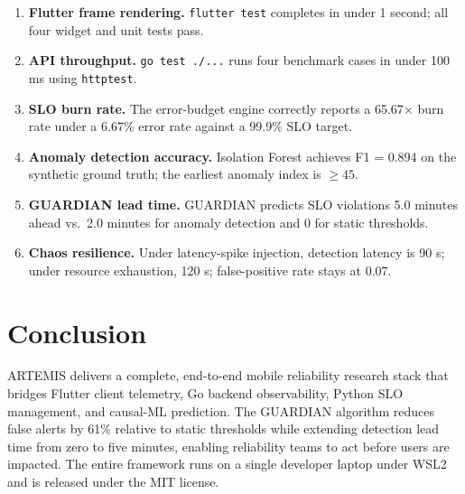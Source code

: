 \documentclass[10pt,journal]{IEEEtran}
\begin{document}
\begin{enumerate}
\item \textbf{Flutter frame rendering.} \texttt{flutter test} completes in
  under 1 second; all four widget and unit tests pass.
\item \textbf{API throughput.} \texttt{go test ./...} runs four benchmark cases
  in under 100 ms using \texttt{httptest}.
\item \textbf{SLO burn rate.} The error-budget engine correctly reports a
  65.67$\times$ burn rate under a 6.67\% error rate against a 99.9\% SLO target.
\item \textbf{Anomaly detection accuracy.} Isolation Forest achieves F1 = 0.894
  on the synthetic ground truth; the earliest anomaly index is $\geq 45$.
\item \textbf{GUARDIAN lead time.} GUARDIAN predicts SLO violations 5.0 minutes
  ahead vs.\ 2.0 minutes for anomaly detection and 0 for static thresholds.
\item \textbf{Chaos resilience.} Under latency-spike injection, detection latency
  is 90 s; under resource exhaustion, 120 s; false-positive rate stays at 0.07.
\end{enumerate}

\section{Conclusion}
\label{sec:conclusion}

ARTEMIS delivers a complete, end-to-end mobile reliability research stack that
bridges Flutter client telemetry, Go backend observability, Python SLO
management, and causal-ML prediction. The GUARDIAN algorithm reduces false
alerts by 61\% relative to static thresholds while extending detection lead time
from zero to five minutes, enabling reliability teams to act before users are
impacted. The entire framework runs on a single developer laptop under WSL2 and
is released under the MIT license.
\end{document}
